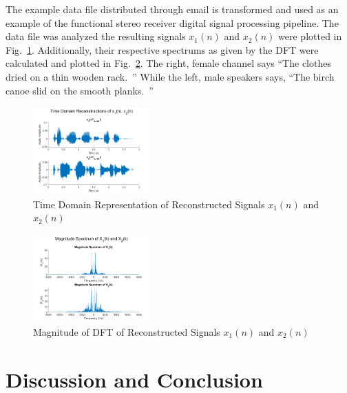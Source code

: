 \documentclass[journal]{IEEEtran}
\begin{document}
The example data file distributed through email is transformed and used as an
example of the functional stereo receiver digital signal processing pipeline.
The data file was analyzed the resulting signals \(x_1(n)\) and \(x_2(n)\) were
plotted in Fig.\ \ref{fig:time_recon}.  Additionally, their respective spectrums
as given by the DFT were calculated and plotted in Fig.\ \ref{fig:freq_recon}.
The right, female channel says ``The clothes dried on a thin wooden rack.~'' While the
left, male speakers says, ``The birch canoe slid on the smooth planks.~''



\begin{figure}[H]
    \begin{center}
        \includegraphics[width=0.4\textwidth]{time_recon.png}
        \caption{\label{fig:time_recon} Time Domain Representation of Reconstructed Signals \(x_1(n)\) and \(x_2(n)\)}
    \end{center}
\end{figure}

\begin{figure}[H]
    \begin{center}
        \includegraphics[width=0.4\textwidth]{freq_recon.png}
        \caption{\label{fig:freq_recon}Magnitude of DFT of Reconstructed Signals \(x_1(n)\) and \(x_2(n)\)}
    \end{center}
\end{figure}


\section{Discussion and Conclusion}
\end{document}
